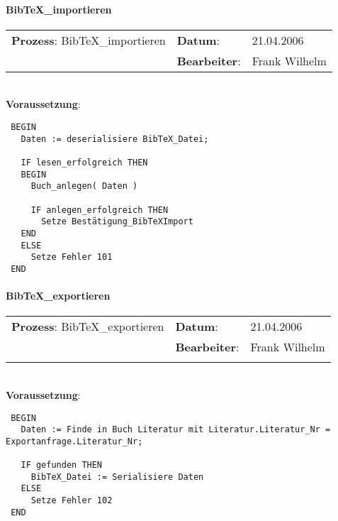 \paragraph{BibTeX\_importieren}
\begin{tabular}[t]{p{9.5cm}ll}
\textbf{Prozess}: BibTeX\_importieren  	&\textbf{Datum}:      &21.04.2006\\
					&\textbf{Bearbeiter}: &Frank Wilhelm\\
\end{tabular}

\hrulefill\\
\textbf{Voraussetzung}:
\begin{verbatim}
 BEGIN
   Daten := deserialisiere BibTeX_Datei;
   
   IF lesen_erfolgreich THEN
   BEGIN
     Buch_anlegen( Daten )
     
     IF anlegen_erfolgreich THEN
       Setze Bestätigung_BibTeXImport
   END
   ELSE
     Setze Fehler 101
 END
\end{verbatim}
\hrulefill


\paragraph{BibTeX\_exportieren}
\begin{tabular}[t]{p{9.5cm}ll}
\textbf{Prozess}: BibTeX\_exportieren  	&\textbf{Datum}:      &21.04.2006\\
					&\textbf{Bearbeiter}: &Frank Wilhelm\\\\
\end{tabular}

\hrulefill\\
\textbf{Voraussetzung}:
\begin{verbatim}
 BEGIN
   Daten := Finde in Buch Literatur mit Literatur.Literatur_Nr = Exportanfrage.Literatur_Nr;
  
   IF gefunden THEN
     BibTeX_Datei := Serialisiere Daten
   ELSE
     Setze Fehler 102
 END
\end{verbatim}

\hrulefill

